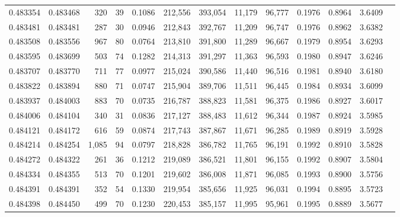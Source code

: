 \begin{tabular}{rrrrrrrrrrrrr}
0.483354 & 0.483468 &   320 &    39 &                                     0.1086 & 212,556 & 393,054 &  11,179 &  96,777 & 0.1976 & 0.8964 & 3.6409 \\
0.483481 & 0.483481 &   287 &    30 &                                     0.0946 & 212,843 & 392,767 &  11,209 &  96,747 & 0.1976 & 0.8962 & 3.6382 \\
0.483508 & 0.483556 &   967 &    80 &                                     0.0764 & 213,810 & 391,800 &  11,289 &  96,667 & 0.1979 & 0.8954 & 3.6293 \\
0.483595 & 0.483699 &   503 &    74 &                                     0.1282 & 214,313 & 391,297 &  11,363 &  96,593 & 0.1980 & 0.8947 & 3.6246 \\
0.483707 & 0.483770 &   711 &    77 &                                     0.0977 & 215,024 & 390,586 &  11,440 &  96,516 & 0.1981 & 0.8940 & 3.6180 \\
0.483822 & 0.483894 &   880 &    71 &                                     0.0747 & 215,904 & 389,706 &  11,511 &  96,445 & 0.1984 & 0.8934 & 3.6099 \\
0.483937 & 0.484003 &   883 &    70 &                                     0.0735 & 216,787 & 388,823 &  11,581 &  96,375 & 0.1986 & 0.8927 & 3.6017 \\
0.484006 & 0.484104 &   340 &    31 &                                     0.0836 & 217,127 & 388,483 &  11,612 &  96,344 & 0.1987 & 0.8924 & 3.5985 \\
0.484121 & 0.484172 &   616 &    59 &                                     0.0874 & 217,743 & 387,867 &  11,671 &  96,285 & 0.1989 & 0.8919 & 3.5928 \\
0.484214 & 0.484254 & 1,085 &    94 &                                     0.0797 & 218,828 & 386,782 &  11,765 &  96,191 & 0.1992 & 0.8910 & 3.5828 \\
0.484272 & 0.484322 &   261 &    36 &                                     0.1212 & 219,089 & 386,521 &  11,801 &  96,155 & 0.1992 & 0.8907 & 3.5804 \\
0.484334 & 0.484355 &   513 &    70 &                                     0.1201 & 219,602 & 386,008 &  11,871 &  96,085 & 0.1993 & 0.8900 & 3.5756 \\
0.484391 & 0.484391 &   352 &    54 &                                     0.1330 & 219,954 & 385,656 &  11,925 &  96,031 & 0.1994 & 0.8895 & 3.5723 \\
0.484398 & 0.484450 &   499 &    70 &                                     0.1230 & 220,453 & 385,157 &  11,995 &  95,961 & 0.1995 & 0.8889 & 3.5677 \\

\end{tabular}
